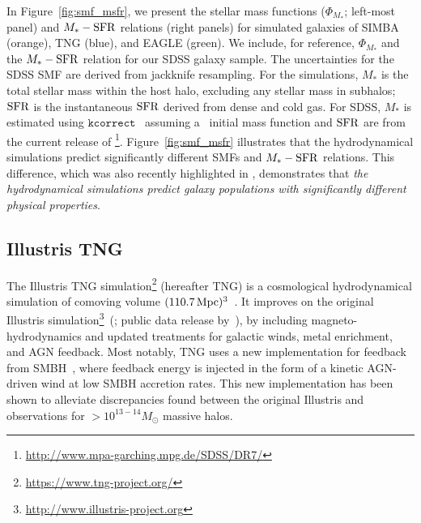 In Figure~\ref{fig:smf_msfr}, we present the stellar mass functions
($\Phi_{M_*}$; left-most panel) and $M_*-{\rm SFR}$ relations (right panels) for
simulated galaxies of SIMBA (orange), TNG (blue), and EAGLE (green). 
We include, for reference, $\Phi_{M_*}$ and the $M_*-{\rm SFR}$ relation for
our SDSS galaxy sample. The uncertainties for the SDSS SMF are derived 
from jackknife resampling. For the simulations, $M_*$ is the total stellar mass 
within the host halo, excluding any stellar mass in subhalos; ${\rm SFR}$ is the
instantaneous ${\rm SFR}$ derived from dense and cold gas. For SDSS, $M_*$ is
estimated using $\mathtt{kcorrect}$~\citep{blanton2007a} 
assuming a~\cite{chabrier2003} initial mass function and ${\rm SFR}$ are from the
current release of
\cite{brinchmann2004}\footnote{\url{http://www.mpa-garching.mpg.de/SDSS/DR7/}}.
Figure~\ref{fig:smf_msfr} illustrates that the hydrodynamical simulations
predict significantly different SMFs and $M_*-{\rm SFR}$ relations. 
This difference, which was also recently highlighted in \cite{hahn2019c}, 
demonstrates that \emph{the hydrodynamical simulations predict galaxy
populations with significantly different physical properties}.

\subsection{Illustris TNG} \label{sec:tng}
The Illustris TNG simulation\footnote{\url{https://www.tng-project.org/}}
(hereafter TNG) is a cosmological hydrodynamical simulation of comoving 
volume $(110.7\,{\rm Mpc})^3$~\citep{nelson2018, pillepich2018, springel2018}. It
improves on the original Illustris
simulation\footnote{\url{http://www.illustris-project.org}}~(\citealt{vogelsberger2014, genel2014};
public data release by~\citealt{nelson2015}), by including
magneto-hydrodynamics and updated treatments for galactic winds, metal
enrichment, and AGN feedback. Most notably, TNG uses a new implementation for
feedback from SMBH~\citep{weinberger2018}, where feedback energy is injected in
the form of a kinetic AGN-driven wind at low SMBH accretion rates. This new
implementation has been shown to alleviate discrepancies found between the
original Illustris and observations for $> 10^{13-14} M_\odot$ massive halos. 

